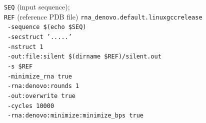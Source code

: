 \documentclass[%
aip,
 amsmath,amssymb,
reprint,%
onecolumn,
]{revtex4-1}
\begin{document}
{\begin{algorithm}[H]
  \caption{Reference conformation Preparation with FARFAR2}
  \label{alg:farfar-minimise}
  \begin{algorithmic}[1]
    \REQUIRE \texttt{SEQ} (input sequence);\\
    \texttt{REF} (reference PDB file)
    \STATE \texttt{rna\_denovo.default.linuxgccrelease} \\
    \ \texttt{-sequence \$(echo \$SEQ)}  \\[-0.2em]
    \ \texttt{-secstruct '.....'}  \\[-0.2em]
    \ \texttt{-nstruct 1} \\[-0.2em]
    \ \texttt{-out:file:silent \$(dirname \$REF)/silent.out} \\[-0.2em]
    \ \texttt{-s \$REF}  \\[-0.2em]
    \ \texttt{-minimize\_rna true} \\[-0.2em]
    \ \texttt{-rna:denovo:rounds 1} \\[-0.2em]
    \ \texttt{-out:overwrite true} \\[-0.2em]
    \ \texttt{-cycles 10000} \\[-0.2em]
    \ \texttt{-rna:denovo:minimize:minimize\_bps true}
  \end{algorithmic}
\end{algorithm}

}
\end{document}
